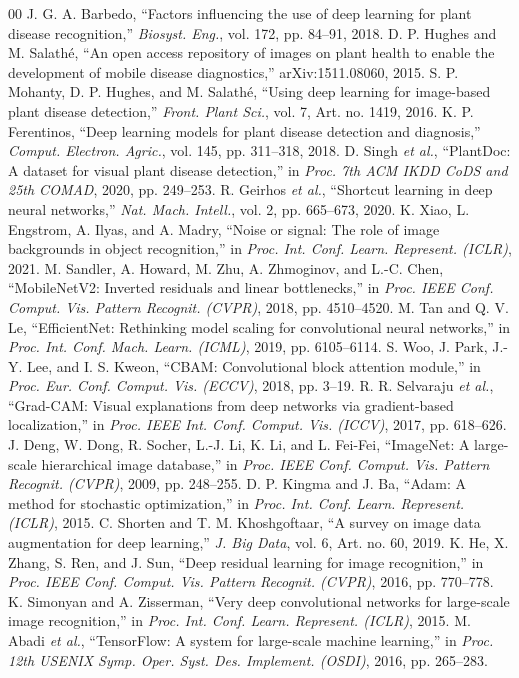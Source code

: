 \documentclass[conference]{IEEEtran}
\begin{document}
\begin{thebibliography}{00}
 J. G. A. Barbedo, ``Factors influencing the use of deep learning for plant disease recognition,'' \emph{Biosyst. Eng.}, vol. 172, pp. 84--91, 2018.
 D. P. Hughes and M. Salath\'e, ``An open access repository of images on plant health to enable the development of mobile disease diagnostics,'' arXiv:1511.08060, 2015.
 S. P. Mohanty, D. P. Hughes, and M. Salath\'e, ``Using deep learning for image-based plant disease detection,'' \emph{Front. Plant Sci.}, vol. 7, Art. no. 1419, 2016.
 K. P. Ferentinos, ``Deep learning models for plant disease detection and diagnosis,'' \emph{Comput. Electron. Agric.}, vol. 145, pp. 311--318, 2018.
 D. Singh \emph{et al.}, ``PlantDoc: A dataset for visual plant disease detection,'' in \emph{Proc. 7th ACM IKDD CoDS and 25th COMAD}, 2020, pp. 249--253.
 R. Geirhos \emph{et al.}, ``Shortcut learning in deep neural networks,'' \emph{Nat. Mach. Intell.}, vol. 2, pp. 665--673, 2020.
 K. Xiao, L. Engstrom, A. Ilyas, and A. Madry, ``Noise or signal: The role of image backgrounds in object recognition,'' in \emph{Proc. Int. Conf. Learn. Represent. (ICLR)}, 2021.
 M. Sandler, A. Howard, M. Zhu, A. Zhmoginov, and L.-C. Chen, ``MobileNetV2: Inverted residuals and linear bottlenecks,'' in \emph{Proc. IEEE Conf. Comput. Vis. Pattern Recognit. (CVPR)}, 2018, pp. 4510--4520.
 M. Tan and Q. V. Le, ``EfficientNet: Rethinking model scaling for convolutional neural networks,'' in \emph{Proc. Int. Conf. Mach. Learn. (ICML)}, 2019, pp. 6105--6114.
 S. Woo, J. Park, J.-Y. Lee, and I. S. Kweon, ``CBAM: Convolutional block attention module,'' in \emph{Proc. Eur. Conf. Comput. Vis. (ECCV)}, 2018, pp. 3--19.
 R. R. Selvaraju \emph{et al.}, ``Grad-CAM: Visual explanations from deep networks via gradient-based localization,'' in \emph{Proc. IEEE Int. Conf. Comput. Vis. (ICCV)}, 2017, pp. 618--626.
 J. Deng, W. Dong, R. Socher, L.-J. Li, K. Li, and L. Fei-Fei, ``ImageNet: A large-scale hierarchical image database,'' in \emph{Proc. IEEE Conf. Comput. Vis. Pattern Recognit. (CVPR)}, 2009, pp. 248--255.
 D. P. Kingma and J. Ba, ``Adam: A method for stochastic optimization,'' in \emph{Proc. Int. Conf. Learn. Represent. (ICLR)}, 2015.
 C. Shorten and T. M. Khoshgoftaar, ``A survey on image data augmentation for deep learning,'' \emph{J. Big Data}, vol. 6, Art. no. 60, 2019.
 K. He, X. Zhang, S. Ren, and J. Sun, ``Deep residual learning for image recognition,'' in \emph{Proc. IEEE Conf. Comput. Vis. Pattern Recognit. (CVPR)}, 2016, pp. 770--778.
 K. Simonyan and A. Zisserman, ``Very deep convolutional networks for large-scale image recognition,'' in \emph{Proc. Int. Conf. Learn. Represent. (ICLR)}, 2015.
 M. Abadi \emph{et al.}, ``TensorFlow: A system for large-scale machine learning,'' in \emph{Proc. 12th USENIX Symp. Oper. Syst. Des. Implement. (OSDI)}, 2016, pp. 265--283.
\end{thebibliography}
\end{document}
